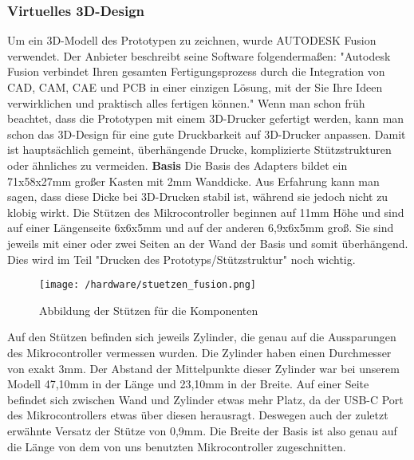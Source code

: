 \documentclass[11pt, twoside]{article}
\begin{document}
\subsubsection{Virtuelles 3D-Design}
Um ein 3D-Modell des Prototypen zu zeichnen, wurde AUTODESK Fusion verwendet. Der Anbieter beschreibt seine Software folgendermaßen: "Autodesk Fusion verbindet Ihren gesamten Fertigungsprozess durch die Integration von CAD, CAM, CAE und PCB in einer einzigen Lösung, mit der Sie Ihre Ideen verwirklichen und praktisch alles fertigen können."\newline
Wenn man schon früh beachtet, dass die Prototypen mit einem 3D-Drucker gefertigt werden, kann man schon das 3D-Design für eine gute Druckbarkeit auf 3D-Drucker anpassen. Damit ist hauptsächlich gemeint, überhängende Drucke, komplizierte Stützstrukturen oder ähnliches zu vermeiden.
\vspace{4mm}\newline
\textbf{Basis} \newline
Die Basis des Adapters bildet ein 71x58x27mm großer Kasten mit 2mm Wanddicke. Aus Erfahrung kann man sagen, dass diese Dicke bei 3D-Drucken stabil ist, während sie jedoch nicht zu klobig wirkt.\newline
Die Stützen des Mikrocontroller beginnen auf 11mm Höhe und sind auf einer Längenseite 6x6x5mm und auf der anderen 6,9x6x5mm groß. Sie sind jeweils mit einer oder zwei Seiten an der Wand der Basis und somit überhängend. Dies wird im Teil "Drucken des Prototyps/Stützstruktur" noch wichtig.\newline
\begin{figure}[H]
\begin{flushleft}
\texttt{[image: /hardware/stuetzen\_fusion.png]}
\caption{Abbildung der Stützen für die Komponenten}
\end{flushleft}
\end{figure}
Auf den Stützen befinden sich jeweils Zylinder, die genau auf die Aussparungen des Mikrocontroller vermessen wurden. Die Zylinder haben einen Durchmesser von exakt 3mm. Der Abstand der Mittelpunkte dieser Zylinder war bei unserem Modell 47,10mm in der Länge und 23,10mm in der Breite. Auf einer Seite befindet sich zwischen Wand und Zylinder etwas mehr Platz, da der USB-C Port des Mikrocontrollers etwas über diesen herausragt. Deswegen auch der zuletzt erwähnte Versatz der Stütze von 0,9mm.\newline
Die Breite der Basis ist also genau auf die Länge von dem von uns benutzten Mikrocontroller zugeschnitten.\newline
\end{document}
